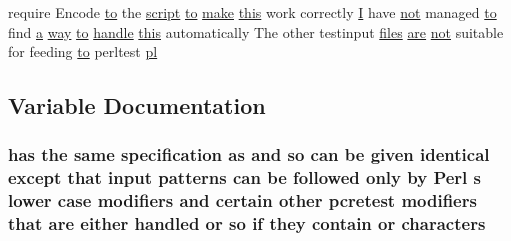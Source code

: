 \begin{DoxyCompactItemize}
require Encode \hyperlink{pcretest_8txt_aa22c98f630e4b3fe86ee17ce5150c62f}{to} the \hyperlink{basic-configuration_8txt_ac1048f198f179d52eda77c5ed6ab9ba9}{script} \hyperlink{pcretest_8txt_aa22c98f630e4b3fe86ee17ce5150c62f}{to} \hyperlink{README_8txt_a83fd323c6a07ea419cc41fd2d0f1675b}{make} \hyperlink{pcregrep_8txt_a1d4586f0a85ecec85237e5fb0f611dd1}{this} work correctly \hyperlink{apr__md5_8c_ac0eafdc9ee161b71e7af98af736952fd}{I} have \hyperlink{pcre_8txt_aab236af6334f68eebb41dff13921475a}{not} managed \hyperlink{pcretest_8txt_aa22c98f630e4b3fe86ee17ce5150c62f}{to} find \hyperlink{pcre_8txt_a841271aab70f5cda9412a19c7753f02c}{a} \hyperlink{pcregrep_8txt_aa4e86b9ea8ebfedd4391c14cb64aa593}{way} \hyperlink{pcretest_8txt_aa22c98f630e4b3fe86ee17ce5150c62f}{to} \hyperlink{group__APR__Util__DBD_ga3ae8808b1c40205ec08c75783ac68810}{handle} \hyperlink{pcregrep_8txt_a1d4586f0a85ecec85237e5fb0f611dd1}{this} automatically The other testinput \hyperlink{pcregrep_8txt_a5aaeef01bce395cfcb41dd64a3bf8607}{files} \hyperlink{pcre_8txt_a98da773651c0ef9992aa9a7bab588058}{are} \hyperlink{pcre_8txt_aab236af6334f68eebb41dff13921475a}{not} suitable for feeding \hyperlink{pcretest_8txt_aa22c98f630e4b3fe86ee17ce5150c62f}{to} perltest \hyperlink{perltest_8txt_a841c59daab01e1f609fdd4547afbe6e6}{pl}
\end{DoxyCompactItemize}


\subsection{Variable Documentation}
\subsubsection[{\texorpdfstring{characters}{characters}}]{ has the same specification {\bf as} and {\bf so} {\bf can} {\bf be} {\bf given} {\bf identical} {\bf except} that {\bf input} {\bf patterns} {\bf can} {\bf be} followed only by {\bf Perl} {\bf s} lower {\bf case} {\bf modifiers} and certain other {\bf pcretest} {\bf modifiers} that {\bf are} either handled {\bf or} {\bf so} {\bf if} they contain {\bf or} characters}\hypertarget{perltest_8txt_a92232f92a4e0a2d76be2a5266ceaf290}{}\label{perltest_8txt_a92232f92a4e0a2d76be2a5266ceaf290}
